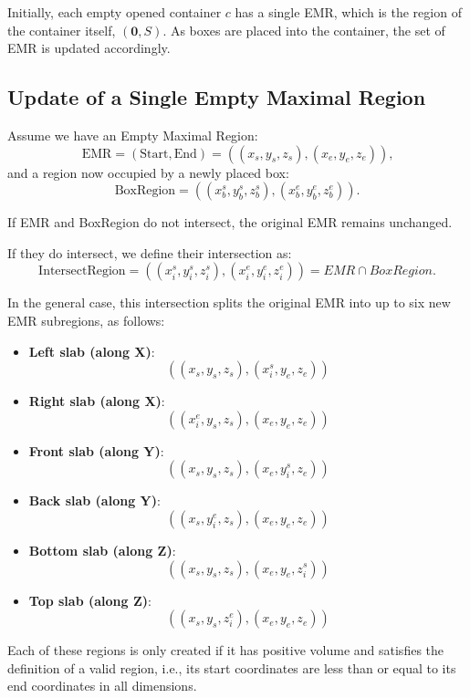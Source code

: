 Initially, each empty opened container $c$ has a single EMR, which is the region of the container itself, $(\mathbf{0}, S)$. As boxes are placed into the container, the set of EMR is updated accordingly.

\subsection{Update of a Single Empty Maximal Region}

Assume we have an Empty Maximal Region:
\[
\text{EMR} = (\text{Start}, \text{End}) = ((x_s, y_s, z_s), (x_e, y_e, z_e))\text{,}
\]
and a region now occupied by a newly placed box:
\[
\text{BoxRegion} = ((x_b^s, y_b^s, z_b^s), (x_b^e, y_b^e, z_b^e))\text{.}
\]

If EMR and BoxRegion do not intersect, the original EMR remains unchanged.

If they do intersect, we define their intersection as:
\[
\text{IntersectRegion} = ((x_i^s, y_i^s, z_i^s), (x_i^e, y_i^e, z_i^e)) = \textit{EMR} \cap \textit{BoxRegion}\text{.}
\]

In the general case, this intersection splits the original EMR into up to six new EMR subregions, as follows:

\begin{itemize}
    \item \textbf{Left slab (along X)}:
    \[
    ((x_s, y_s, z_s), (x_i^s, y_e, z_e)) 
    \]

    \item \textbf{Right slab (along X)}:
    \[
    ((x_i^e, y_s, z_s), (x_e, y_e, z_e)) 
    \]

    \item \textbf{Front slab (along Y)}:
    \[
    ((x_s, y_s, z_s), (x_e, y_i^s, z_e)) 
    \]

    \item \textbf{Back slab (along Y)}:
    \[
    ((x_s, y_i^e, z_s), (x_e, y_e, z_e))
    \]

    \item \textbf{Bottom slab (along Z)}:
    \[
    ((x_s, y_s, z_s), (x_e, y_e, z_i^s))
    \]

    \item \textbf{Top slab (along Z)}:
    \[
    ((x_s, y_s, z_i^e), (x_e, y_e, z_e))
    \]
\end{itemize}

Each of these regions is only created if it has positive volume and satisfies the definition of a valid region, i.e., its start coordinates are less than or equal to its end coordinates in all dimensions.

